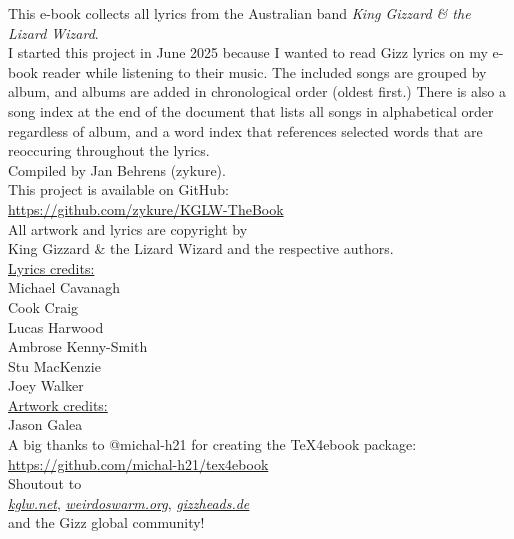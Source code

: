 \begin{center}
{%
\vspace*{\fill}%

This e-book collects all lyrics from the Australian band \emph{King Gizzard \& the Lizard Wizard}. \\[1em]
I started this project in June 2025 because I wanted to read Gizz lyrics on my e-book reader while listening to their music.
The included songs are grouped by album, and albums are added in chronological order (oldest first.)
There is also a song index at the end of the document that lists all songs in alphabetical order regardless of album,
and a word index that references selected words that are reoccuring throughout the lyrics. \\[1em]

Compiled by Jan Behrens (zykure). \\[1em]

This project is available on GitHub: \\
\href{https://github.com/zykure/KGLW-TheBook}{https://github.com/zykure/KGLW-TheBook} \\[2em]

All artwork and lyrics are copyright by \\
King Gizzard \& the Lizard Wizard and the respective authors. \\[2em]

\underline{Lyrics credits:} \\
Michael Cavanagh \\
Cook Craig \\
Lucas Harwood \\
Ambrose Kenny-Smith \\
Stu MacKenzie \\
Joey Walker \\[2em]

\underline{Artwork credits:} \\
Jason Galea \\[2em]

A big thanks to @michal-h21 for creating the TeX4ebook package: \\
\href{https://github.com/michal-h21/tex4ebook}{https://github.com/michal-h21/tex4ebook} \\[1em]

Shoutout to \\
\href{https://kglw.net}{\textit{kglw.net}}, \href{https://weirdoswarm.org}{\textit{weirdoswarm.org}}, \href{https://gizzheads.de}{\textit{gizzheads.de}} \\
and the Gizz global community! \\

\vfill%
}%
\end{center}

